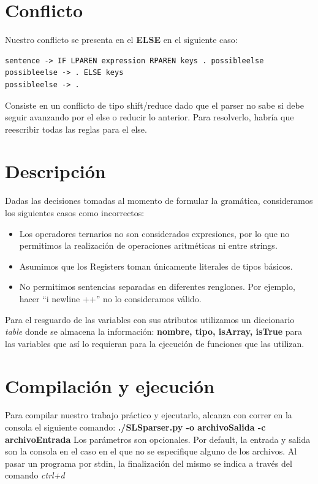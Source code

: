 \documentclass[10pt,a4paper]{article}
\begin{document}
\section{Conflicto}
Nuestro conflicto se presenta en el \textbf{ELSE} en el siguiente caso:

\begin{verbatim}
sentence -> IF LPAREN expression RPAREN keys . possibleelse
possibleelse -> . ELSE keys
possibleelse -> .
\end{verbatim}

Consiste en un conflicto de tipo shift/reduce dado que el parser no sabe si debe seguir avanzando por el else o reducir lo anterior. Para resolverlo, habría que reescribir todas las reglas para el else.

\section{Descripción}

Dadas las decisiones tomadas al momento de formular la gramática, consideramos los siguientes casos como incorrectos:

\begin{itemize}
\item Los operadores ternarios no son considerados expresiones, por lo que no permitimos la realización de operaciones aritméticas ni entre strings.
\item Asumimos que los Registers toman únicamente literales de tipos básicos.
\item No permitimos sentencias separadas en diferentes renglones. Por ejemplo, hacer ``i newline ++'' no lo consideramos válido.
\end{itemize}

Para el resguardo de las variables con sus atributos utilizamos un diccionario \textit{table} donde se almacena la información: \textbf{nombre, tipo, isArray, isTrue} para las variables que así lo requieran para la ejecución de funciones que las utilizan.

\section{Compilación y ejecución}
Para compilar nuestro trabajo práctico y ejecutarlo, alcanza con correr en la consola el siguiente comando:
\textbf{./SLSparser.py -o archivoSalida -c archivoEntrada} 
Los parámetros son opcionales. Por default, la entrada y salida son la consola en el caso en el que no se especifique alguno de los archivos.
Al pasar un programa por stdin, la finalización del mismo se indica a través del comando \textit{ctrl+d}
\end{document}
